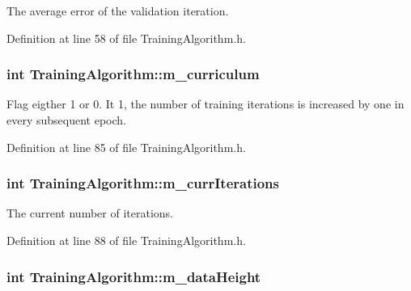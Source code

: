The average error of the validation iteration. 



Definition at line 58 of file Training\+Algorithm.\+h.

\subsubsection[{\texorpdfstring{m\+\_\+curriculum}{m_curriculum}}]{\setlength{\rightskip}{0pt plus 5cm}int Training\+Algorithm\+::m\+\_\+curriculum\hspace{0.3cm}{\ttfamily [private]}}\hypertarget{classTrainingAlgorithm_ac00da5dcd2bf50277ef44e1543b9d919}{}\label{classTrainingAlgorithm_ac00da5dcd2bf50277ef44e1543b9d919}


Flag eigther 1 or 0. It 1, the number of training iterations is increased by one in every subsequent epoch. 



Definition at line 85 of file Training\+Algorithm.\+h.

\subsubsection[{\texorpdfstring{m\+\_\+curr\+Iterations}{m_currIterations}}]{\setlength{\rightskip}{0pt plus 5cm}int Training\+Algorithm\+::m\+\_\+curr\+Iterations\hspace{0.3cm}{\ttfamily [private]}}\hypertarget{classTrainingAlgorithm_a0b9caeb8ebd28c40838d1bd8b554d296}{}\label{classTrainingAlgorithm_a0b9caeb8ebd28c40838d1bd8b554d296}


The current number of iterations. 



Definition at line 88 of file Training\+Algorithm.\+h.

\subsubsection[{\texorpdfstring{m\+\_\+data\+Height}{m_dataHeight}}]{\setlength{\rightskip}{0pt plus 5cm}int Training\+Algorithm\+::m\+\_\+data\+Height\hspace{0.3cm}{\ttfamily [private]}}\hypertarget{classTrainingAlgorithm_ac367cb8900241c4c817d6e5b7f212c4c}{}\label{classTrainingAlgorithm_ac367cb8900241c4c817d6e5b7f212c4c}


